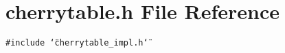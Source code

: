 \section{cherrytable.h File Reference}
\label{cherrytable_8h}
{\tt \#include \char`\"{}cherrytable\_\-impl.h\char`\"{}}\par
